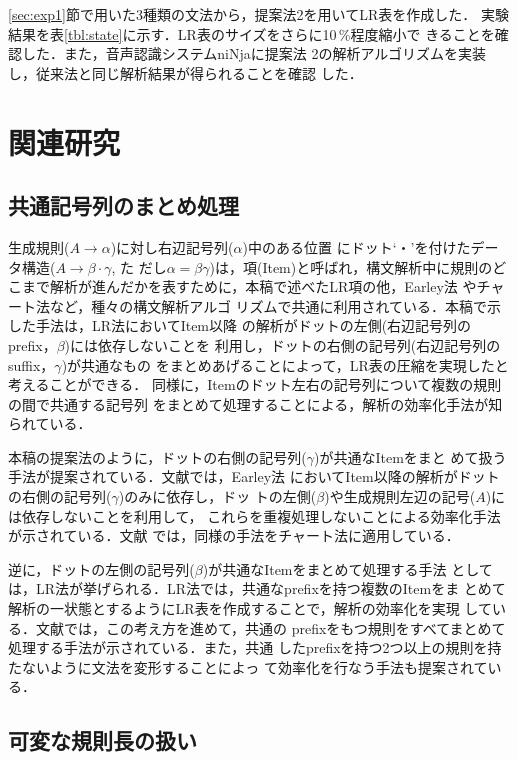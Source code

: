 \ref{sec:exp1}節で用いた3種類の文法から，提案法2を用いてLR表を作成した．
実験結果を表\ref{tbl:state}に示す．LR表のサイズをさらに10\,\%程度縮小で
きることを確認した．また，音声認識システムniNja\cite{itou1992}に提案法
2の解析アルゴリズムを実装し，従来法と同じ解析結果が得られることを確認
した．

\section{関連研究}
\label{ss:related}

\subsection{共通記号列のまとめ処理}

生成規則($A \rightarrow \alpha$)に対し右辺記号列($\alpha$)中のある位置
にドット`・'を付けたデータ構造($A \rightarrow \beta \cdot \gamma$,  た
だし$\alpha = \beta \gamma$)は，項(Item)と呼ばれ，構文解析中に規則のど
こまで解析が進んだかを表すために，本稿で述べたLR項の他，Earley法
\cite{earley1970}やチャート法\cite{key1980}など，種々の構文解析アルゴ
リズムで共通に利用されている．本稿で示した手法は，LR法においてItem以降
の解析がドットの左側(右辺記号列のprefix，$\beta$)には依存しないことを
利用し，ドットの右側の記号列(右辺記号列のsuffix，$\gamma$)が共通なもの
をまとめあげることによって，LR表の圧縮を実現したと考えることができる．
同様に，Itemのドット左右の記号列について複数の規則の間で共通する記号列
をまとめて処理することによる，解析の効率化手法が知られている．

本稿の提案法のように，ドットの右側の記号列($\gamma$)が共通なItemをまと
めて扱う手法が提案されている．文献\cite{leermakers1992}では，Earley法
においてItem以降の解析がドットの右側の記号列($\gamma$)のみに依存し，ドッ
トの左側($\beta$)や生成規則左辺の記号($A$)には依存しないことを利用して，
これらを重複処理しないことによる効率化手法が示されている．文献
\cite{moore2000}では，同様の手法をチャート法に適用している．

逆に，ドットの左側の記号列($\beta$)が共通なItemをまとめて処理する手法
としては，LR法が挙げられる．LR法では，共通なprefixを持つ複数のItemをま
とめて解析の一状態とするようにLR表を作成することで，解析の効率化を実現
している．文献\cite{nederhof1994}では，この考え方を進めて，共通の
prefixをもつ規則をすべてまとめて処理する手法が示されている．また，共通
したprefixを持つ2つ以上の規則を持たないように文法を変形することによっ
て効率化を行なう手法も提案されている\cite{moore2000}．

\subsection{可変な規則長の扱い}

